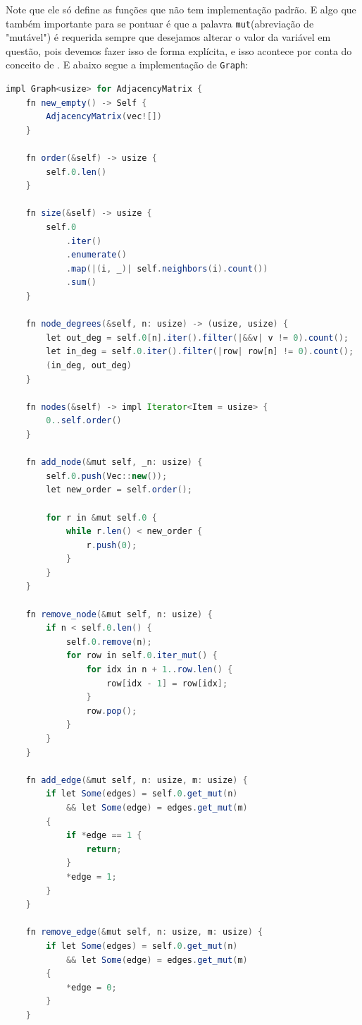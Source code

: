 Note que ele só define as funções que não tem implementação padrão. E algo que também importante para se pontuar é que a palavra \texttt{mut}(abreviação de "mutável") é requerida sempre que desejamos alterar o valor da variável em questão, pois devemos fazer isso de forma explícita, e isso acontece por conta do conceito de \cite{ownership}. E abaixo segue a implementação de \texttt{Graph}:

\begin{lstlisting}[language=Java, caption={Implementação de Graph na Estrutura de Dados Matriz de Adjacência}, label=list:impl_adj_mat_g]
impl Graph<usize> for AdjacencyMatrix {
    fn new_empty() -> Self {
        AdjacencyMatrix(vec![])
    }

    fn order(&self) -> usize {
        self.0.len()
    }

    fn size(&self) -> usize {
        self.0
            .iter()
            .enumerate()
            .map(|(i, _)| self.neighbors(i).count())
            .sum()
    }

    fn node_degrees(&self, n: usize) -> (usize, usize) {
        let out_deg = self.0[n].iter().filter(|&&v| v != 0).count();
        let in_deg = self.0.iter().filter(|row| row[n] != 0).count();
        (in_deg, out_deg)
    }

    fn nodes(&self) -> impl Iterator<Item = usize> {
        0..self.order()
    }

    fn add_node(&mut self, _n: usize) {
        self.0.push(Vec::new());
        let new_order = self.order();

        for r in &mut self.0 {
            while r.len() < new_order {
                r.push(0);
            }
        }
    }

    fn remove_node(&mut self, n: usize) {
        if n < self.0.len() {
            self.0.remove(n);
            for row in self.0.iter_mut() {
                for idx in n + 1..row.len() {
                    row[idx - 1] = row[idx];
                }
                row.pop();
            }
        }
    }

    fn add_edge(&mut self, n: usize, m: usize) {
        if let Some(edges) = self.0.get_mut(n)
            && let Some(edge) = edges.get_mut(m)
        {
            if *edge == 1 {
                return;
            }
            *edge = 1;
        }
    }

    fn remove_edge(&mut self, n: usize, m: usize) {
        if let Some(edges) = self.0.get_mut(n)
            && let Some(edge) = edges.get_mut(m)
        {
            *edge = 0;
        }
    }


\end{lstlisting}
